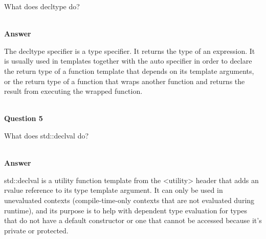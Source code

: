 What does decltype do?

\hspace*{\fill} \\ %
\noindent
\textbf{Answer}

The decltype specifier is a type specifier. It returns the type of an expression. It is usually used in templates together with the auto specifier in order to declare the return type of a function template that depends on its template arguments, or the return type of a function that wraps another function and returns the result from executing the wrapped function.

\hspace*{\fill} \\ %
\noindent
\textbf{Question 5}

What does std::declval do?

\hspace*{\fill} \\ %
\noindent
\textbf{Answer}

std::declval is a utility function template from the <utility> header that adds an rvalue reference to its type template argument. It can only be used in unevaluated contexts (compile-time-only contexts that are not evaluated during runtime), and its purpose is to help with dependent type evaluation for types that do not have a default constructor or one that cannot be accessed because it’s private or protected.













